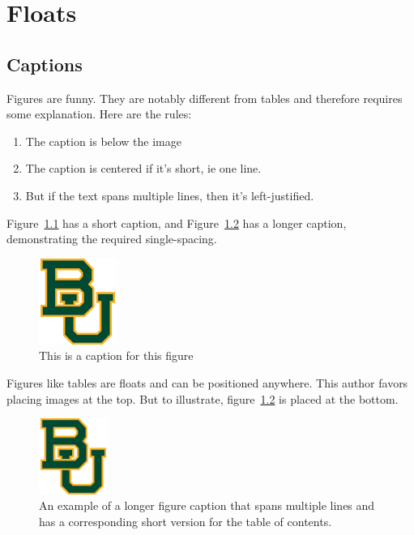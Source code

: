 \chapter{Floats}
\label{chapter:ch4}

\section{Captions}
Figures are funny. They are notably different from tables and therefore requires some explanation. Here are the rules:
\begin{enumerate}
\item The caption is below the image
\item The caption is centered if it's short, ie one line. 
\item But if the text spans multiple lines, then it's left-justified. 
\end{enumerate}

Figure~\ref{figure_example1} has a short caption, and
Figure~\ref{figure_example2} has a longer caption, demonstrating the required
single-spacing.

\begin{figure}[ht]
\centering
\includegraphics[width=1in]{baylor}
\caption{This is a caption for this figure}
\label{figure_example1}
\end{figure}

Figures like tables are floats and can be positioned anywhere. 
This author favors placing images at the top. 
But to illustrate, figure~\ref{figure_example2} is placed at the bottom. 

\begin{figure}[b]
\centering
\includegraphics[width=0.2\textwidth]{baylor}
\caption[The short table of contents version]{An example of a longer figure
caption that spans multiple lines and has a corresponding short version for the
table of contents.}
\label{figure_example2}
\end{figure}

